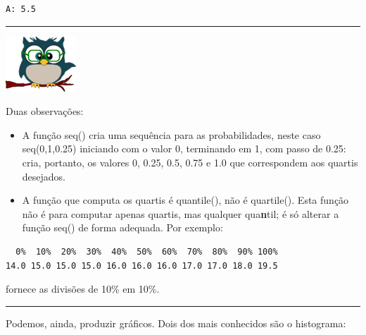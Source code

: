 \documentclass[
]{article}
\newenvironment{Shaded}{\begin{snugshade}}{\end{snugshade}}
\newcommand{\AttributeTok}[1]{\textcolor[rgb]{0.77,0.63,0.00}{#1}}
\newcommand{\DecValTok}[1]{\textcolor[rgb]{0.00,0.00,0.81}{#1}}
\newcommand{\FloatTok}[1]{\textcolor[rgb]{0.00,0.00,0.81}{#1}}
\newcommand{\FunctionTok}[1]{\textcolor[rgb]{0.00,0.00,0.00}{#1}}
\newcommand{\NormalTok}[1]{#1}
\newcommand{\SpecialCharTok}[1]{\textcolor[rgb]{0.00,0.00,0.00}{#1}}
\begin{document}
\begin{verbatim}
A: 5.5
\end{verbatim}

\begin{center}\rule{0.5\linewidth}{0.5pt}\end{center}

\begin{flushleft}\includegraphics[width=0.08\linewidth]{coruja} \end{flushleft}

Duas observações:

\begin{itemize}
\item
  A função seq() cria uma sequência para as probabilidades, neste caso
  seq(0,1,0.25) iniciando com o valor 0, terminando em 1, com passo de
  0.25: cria, portanto, os valores 0, 0.25, 0.5, 0.75 e 1.0 que
  correspondem aos quartis desejados.
\item
  A função que computa os quartis é quantile(), não é quartile(). Esta
  função não é para computar apenas quartis, mas qualquer
  qua\textbf{n}til; é só alterar a função seq() de forma adequada. Por
  exemplo:
\end{itemize}

\begin{Shaded}
\end{Shaded}

\begin{verbatim}
  0%  10%  20%  30%  40%  50%  60%  70%  80%  90% 100% 
14.0 15.0 15.0 15.0 16.0 16.0 16.0 17.0 17.0 18.0 19.5 
\end{verbatim}

fornece as divisões de 10\% em 10\%.

\begin{center}\rule{0.5\linewidth}{0.5pt}\end{center}

Podemos, ainda, produzir gráficos. Dois dos mais conhecidos são o
histograma:

\begin{Shaded}
\end{Shaded}
\end{document}
